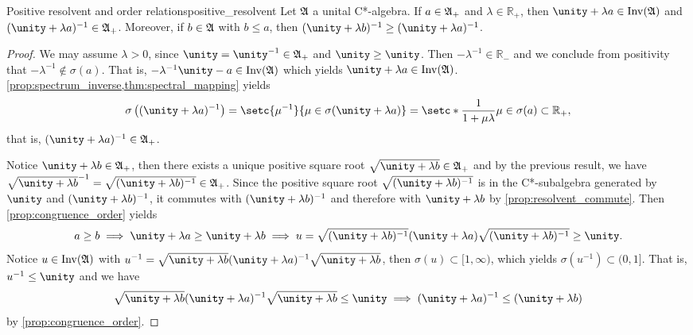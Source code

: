 \begin{proposition}{Positive resolvent and order relations}{positive_resolvent}
    Let \(\mathfrak{A}\) a unital C*-algebra. If \(a \in \mathfrak{A}_+\) and \(\lambda \in \mathbb{R}_+\), then \(\unity + \lambda a \in \invertible{\algebra{A}}\) and \((\unity + \lambda a)^{-1} \in \algebra{A}_+\). Moreover, if \(b \in \mathfrak{A}\) with \(b \leq a\), then \((\unity +\lambda b)^{-1} \geq (\unity + \lambda a)^{-1}\).
\end{proposition}
\begin{proof}
    We may assume \(\lambda > 0\), since \(\unity = \unity^{-1} \in \algebra{A}_+\) and \(\unity \geq \unity\). Then \(-\lambda^{-1} \in \mathbb{R}_-\) and we conclude from positivity that \(-\lambda^{-1} \notin \sigma(a)\). That is, \(-\lambda^{-1} \unity - a \in \invertible{\algebra{A}}\) which yields \(\unity + \lambda a \in \invertible{\algebra{A}}\). \cref{prop:spectrum_inverse,thm:spectral_mapping} yields
    \begin{equation*}
        \sigma\left((\unity + \lambda a)^{-1}\right) = \setc{\mu^{-1}}{\mu \in \sigma(\unity + \lambda a)} = \setc*{\frac1{1 + \mu \lambda}}{\mu \in \sigma(a)} \subset \mathbb{R}_+,
    \end{equation*}
    that is, \((\unity + \lambda a)^{-1} \in \algebra{A}_+\).

    Notice \(\unity + \lambda b \in \algebra{A}_+\), then there exists a unique positive square root \(\sqrt{\unity + \lambda b} \in \algebra{A}_+\) and by the previous result, we have \(\sqrt{\unity + \lambda b}^{-1} = \sqrt{(\unity + \lambda b)^{-1}} \in \algebra{A}_+\). Since the positive square root \(\sqrt{(\unity + \lambda b)^{-1}}\) is in the C*-subalgebra generated by \(\unity\) and \((\unity + \lambda b)^{-1}\), it commutes with \((\unity + \lambda b)^{-1}\) and therefore with \(\unity + \lambda b\) by \cref{prop:resolvent_commute}. Then \cref{prop:congruence_order} yields
    \begin{equation*}
        a \geq b \implies \unity + \lambda a \geq \unity + \lambda b \implies  u = \sqrt{(\unity + \lambda b)^{-1}} (\unity + \lambda a) \sqrt{(\unity + \lambda b)^{-1}} \geq \unity.
    \end{equation*}
    Notice \(u \in \operatorname{Inv}(\mathfrak{A})\) with \(u^{-1} = \sqrt{\unity + \lambda b} (\unity + \lambda a)^{-1} \sqrt{\unity + \lambda b}\), then \(\sigma(u) \subset [1, \infty)\), which yields \(\sigma(u^{-1}) \subset (0, 1]\). That is, \(u^{-1} \leq \unity\) and we have
    \begin{equation*}
        \sqrt{\unity + \lambda b} (\unity + \lambda a)^{-1} \sqrt{\unity + \lambda b} \leq \unity \implies (\unity + \lambda a)^{-1} \leq (\unity + \lambda b)
    \end{equation*}
    by \cref{prop:congruence_order}.
\end{proof}
